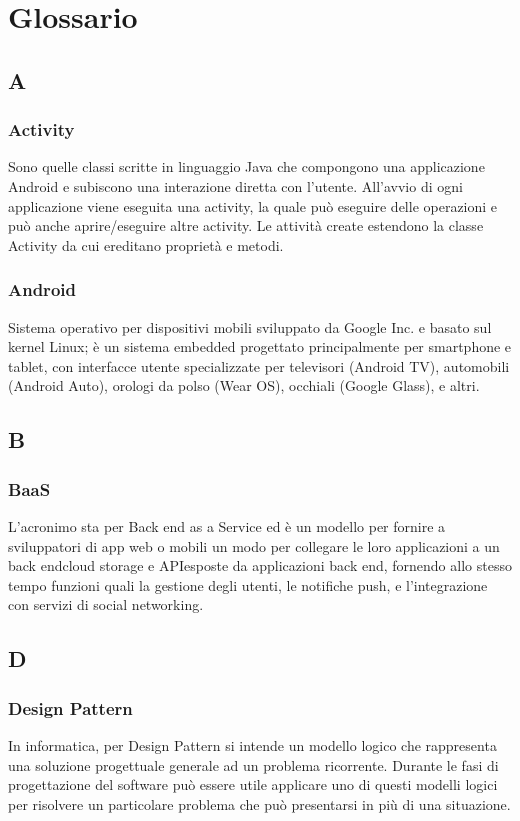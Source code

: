\section{Glossario}
\subsection*{A}
\subsubsection*{Activity}
Sono quelle classi scritte in linguaggio Java che compongono una applicazione Android e subiscono
una interazione diretta con l'utente. All'avvio di ogni applicazione viene eseguita una activity, la
quale può eseguire delle operazioni e può anche aprire/eseguire altre activity. Le attività create
estendono la classe Activity da cui ereditano proprietà e metodi.

\subsubsection*{Android}
Sistema operativo per dispositivi mobili sviluppato da Google Inc. e basato sul kernel Linux; è
un sistema embedded progettato principalmente per smartphone e tablet, con interfacce utente
specializzate per televisori (Android TV), automobili (Android Auto), orologi da polso (Wear
OS), occhiali (Google Glass), e altri.

\subsection*{B}
\subsubsection*{BaaS}
L'acronimo sta per Back end as a Service ed è un modello per fornire a sviluppatori di app web o mobili un modo per collegare le loro applicazioni a un back end\glosp cloud storage e API\glosp esposte da applicazioni back end\glosp, fornendo allo stesso tempo funzioni quali la gestione degli utenti, le notifiche push, e l'integrazione con servizi di social networking.

\subsection*{D}
\subsubsection*{Design Pattern}
In informatica, per Design Pattern si intende un modello logico che rappresenta una soluzione progettuale generale ad un problema ricorrente. Durante le fasi di progettazione del software può essere utile applicare uno di questi modelli logici per risolvere un particolare
problema che può presentarsi in più di una situazione.

